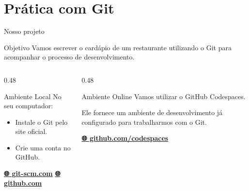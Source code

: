 \section{Prática com Git}

\begin{frame}{Nosso projeto}

  \begin{block}{Objetivo}
    Vamos escrever o cardápio de um restaurante utilizando o Git para acompanhar o processo de desenvolvimento.
  \end{block}
  \begin{columns}[T]
    \begin{column}{0.48\textwidth}
      \begin{block}{Ambiente Local}
        No seu computador:
        \begin{itemize}
          \item Instale o Git pelo site oficial.
          \item Crie uma conta no GitHub.
        \end{itemize}
        \vspace{0.2cm}
        \centering

        \href{https://git-scm.com/}{\textbf{🌐 git-scm.com}} \quad \href{https://github.com/}{\textbf{🌐 github.com}}
      \end{block}
    \end{column}
    \begin{column}{0.48\textwidth}
      \begin{block}{Ambiente Online}
        Vamos utilizar o GitHub Codespaces.

        \vspace{0.2cm}
        Ele fornece um ambiente de desenvolvimento já configurado para trabalharmos com o Git.

        \vspace{0.2cm}
        \centering
        \href{https://github.com/codespaces}{\textbf{🌐 github.com/codespaces}}
      \end{block}
    \end{column}
  \end{columns}
\end{frame}

